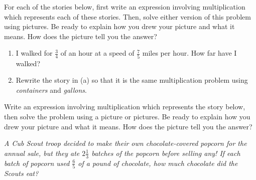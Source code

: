 \documentclass[nooutcomes]{ximera}
\begin{document}
\begin{problem}
 For each of the stories below, first write an expression involving multiplication which represents each of these stories.  Then, solve either version of this problem using pictures.  Be ready to explain how you drew your picture and what it means.  How does the picture tell you the answer? 

\begin{enumerate}
    \item I walked for  $\frac{3}{4}$ of an hour at a speed of  $\frac{7}{5}$ miles per hour.  How far have I walked?
    \item Rewrite the story in (a) so that it is the same multiplication problem using \emph{containers} and \emph{gallons}.
\end{enumerate}
\end{problem}
\vfill

\begin{problem}
 Write an expression involving multiplication which represents the story below, then solve the problem using a picture or pictures.  Be ready to explain how you drew your picture and what it means.  How does the picture tell you the answer?


\emph{A Cub Scout troop decided to make their own chocolate-covered popcorn for the annual sale, but they ate $2 \frac{1}{3}$ batches of the popcorn before selling any! If each batch of popcorn used $\frac{6}{5}$ of a pound of chocolate, how much chocolate did the Scouts eat?}

\end{problem}
\vfill
 
\end{document}
